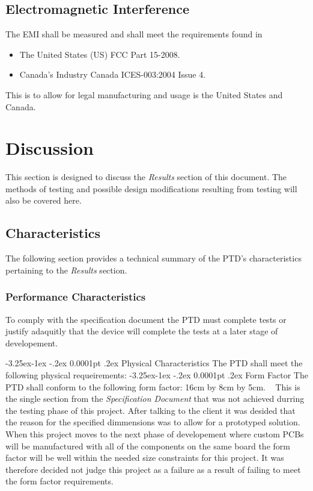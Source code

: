 \documentclass[11pt]{article}
\makeatletter
\renewcommand\paragraph{\@startsection{paragraph}{4}{\z@}%
                                     {-3.25ex\@plus -1ex \@minus -.2ex}%
                                     {0.0001pt \@plus .2ex}%
                                     {\normalfont\normalsize\bfseries}}
\renewcommand\subparagraph{\@startsection{subparagraph}{5}{\z@}%
                                     {-3.25ex\@plus -1ex \@minus -.2ex}%
                                     {0.0001pt \@plus .2ex}%
                                     {\normalfont\normalsize\bfseries}}
\makeatother
\begin{document}
\subsection{Electromagnetic Interference}
The EMI shall be measured and shall meet the requirements found in 
\begin{itemize}
    \item The United States (US) FCC Part 15-2008.
    \item Canada's Industry Canada ICES-003:2004 Issue 4.
\end{itemize}
This is to allow for legal manufacturing and usage is the United States and Canada.

\section{Discussion}
This section is designed to discuss the \textit{Results} section of this document. The methods of testing and possible design modifications resulting from 
testing will also be covered here.

\subsection{Characteristics}
The following section provides a technical summary of the PTD's characteristics pertaining to the \textit{Results} section.

\subsubsection{Performance Characteristics}
To comply with the specification document the PTD must complete tests or justify adaquitly that the device will complete the tests at a later stage of developement.

\paragraph{Physical Characteristics}
The PTD shall meet the following physical requeirements:
    \subparagraph{Form Factor}  The PTD shall conform to the following form factor: 16cm by 8cm by 5cm. \newline ~ \newline
        This is the single section from the \textit{Specification Document} that was not achieved durring the testing phase of this project. After talking to the client
        it was desided that the reason for the specified dimmensions was to allow for a prototyped solution. When this project moves to the next phase of developement where
        custom PCBs will be manufactured with all of the components on the same board the form factor will be well within the needed size constraints for this project.
        It was therefore decided not judge this project as a failure as a result of failing to meet the form factor requirements.
\end{document}
